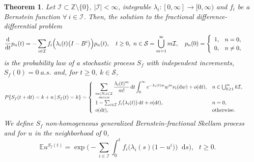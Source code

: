 \documentclass[12pt, twoside, english, headsepline]{article}
\newcommand*\dif{\mathop{}\!\mathrm{d}}  %
\newtheorem{theorem}{Theorem}[section] %
\theoremstyle{definition} %
\numberwithin{equation}{section} %
\begin{document}
\begin{theorem}\label{teoremaDefinzioniEquivalentiSkellamGeneralizzatoBernstein}
Let $\mathcal{I}\subset \mathbb{Z}\setminus\{0\}, \ |\mathcal{I}|<\infty$, integrable $\lambda_i : [0,\infty] \longrightarrow [0, \infty)$ and $f_i$ be a Bernstein function $\forall\ i\in\mathcal{I}$. Then, the solution to the fractional difference-differential problem 
\begin{equation}\label{equazioneDifferenzeDifferenzialeSkellamGeneralizzatoOperatoriBernstein}
  \frac{\dif }{\dif t} p_n(t)= -\sum_{i\in\mathcal{I}} f_i\Bigl( \lambda_i(t)\big(I-B^i\big) \Bigr)p_n(t), \ \ \ t \ge0,\ n\in \mathcal{S} =  \bigcup_{m=1}^\infty m\mathcal{I},\ \ \ p_n(0) =\begin{cases}\begin{array}{l l}1,& n=0,\\0,&n\not=0,\end{array}\end{cases} 
\end{equation}
is the probability law of a stochastic process $S_f$ with independent increments, $S_f(0) = 0\ a.s.$ and, for $t\ge0,\ k\in \mathcal{S}$,
\begin{equation}\label{definizioneInfinitesimaleSkellamGeneralizzatoNonOmogeneoBernstein}
P\{S_f(t+\dif t) = k+n\,|\,S_f(t) = k\} = 
\begin{cases}
\begin{array}{l l}
\displaystyle\sum_{\substack{m\in\mathbb{N}, i\in\mathcal{I}\\mi = n}} \frac{\lambda_i(t)^m}{m!}\dif t \int_0^\infty e^{-\lambda_i(t) w} w^m\nu_i(\dif w)+ o(\dif t), & n\in \bigcup_{k\ge1}^\infty k\mathcal{I},\\
1-\sum_{i\in\mathcal{I}} f_i\big(\lambda_i(t)\big) \dif t + o(\dif t), & n=0, \\
o(\dif t), & \text{otherwise}.
\end{array}
\end{cases}
\end{equation}
We define $S_f$ non-homogeneous generalized Bernstein-fractional Skellam process and for $u$ in the neighborhood of $0$,
\begin{equation}\label{funzioneGeneratriceProbabilitaSkellamFrazionarioBernstein}
\mathbb{E} u^{S_f(t)} = \exp\Biggl(-\sum_{i\in \mathcal{I}} \int_0^t f_i\Big(\lambda_i(s)\big(1-u^i\big)\Big)\dif s\Biggr), \ \ \ t\ge0.
\end{equation} 
\end{theorem}
\end{document}

